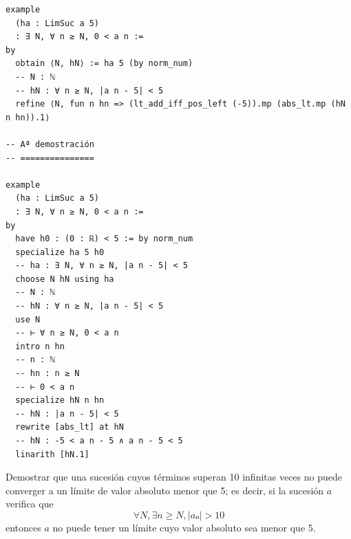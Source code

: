 \begin{verbatim}
example
  (ha : LimSuc a 5)
  : ∃ N, ∀ n ≥ N, 0 < a n :=
by
  obtain ⟨N, hN⟩ := ha 5 (by norm_num)
  -- N : ℕ
  -- hN : ∀ n ≥ N, |a n - 5| < 5
  refine ⟨N, fun n hn => (lt_add_iff_pos_left (-5)).mp (abs_lt.mp (hN n hn)).1⟩

-- Aª demostración
-- ===============

example
  (ha : LimSuc a 5)
  : ∃ N, ∀ n ≥ N, 0 < a n :=
by
  have h0 : (0 : ℝ) < 5 := by norm_num
  specialize ha 5 h0
  -- ha : ∃ N, ∀ n ≥ N, |a n - 5| < 5
  choose N hN using ha
  -- N : ℕ
  -- hN : ∀ n ≥ N, |a n - 5| < 5
  use N
  -- ⊢ ∀ n ≥ N, 0 < a n
  intro n hn
  -- n : ℕ
  -- hn : n ≥ N
  -- ⊢ 0 < a n
  specialize hN n hn
  -- hN : |a n - 5| < 5
  rewrite [abs_lt] at hN
  -- hN : -5 < a n - 5 ∧ a n - 5 < 5
  linarith [hN.1]
\end{verbatim}

\begin{ejercicio}
  Demostrar que una sucesión cuyos términos superan 10 infinitas veces
  no puede converger a un límite de valor absoluto menor que 5; es
  decir, si la sucesión $a$ verifica que
     $$∀ N, ∃ n ≥ N, |aₙ| > 10$$
  entonces $a$ no puede tener un límite cuyo valor absoluto sea menor que
  5.
\end{ejercicio}

